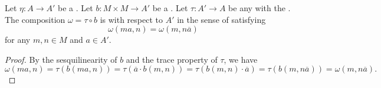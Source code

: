 \begin{lemma} \label{lemma:composition_of_sesquilinear_form_over_ring_with_involution_by_function_to_base_ring_with_trace_property_is_compatible_with_scalars}
    Let $\eta: A \to A'$ be a . Let $b: M \times M \to A'$ be a . Let $\tau: A' \to A$ be any  with the .
    The composition $\omega = \tau \circ b$ is 
     with respect to $A'$ in the sense of satisfying
    $$\omega(ma, n) = \omega(m, n \overline{a})$$
    for any $m,n \in M$ and $a \in A'$. 
\end{lemma}
\begin{proof}
    By the sesquilinearity of $b$  and  the trace property of $\tau$, we have 
    $$\omega(ma, n) = \tau(b(ma, n)) = \tau(\overline{a} \cdot b(m,n)) = \tau(b(m,n) \cdot \overline{a}) = \tau(b(m, n \overline{a})) = \omega(m, n \overline{a}).$$
\end{proof}